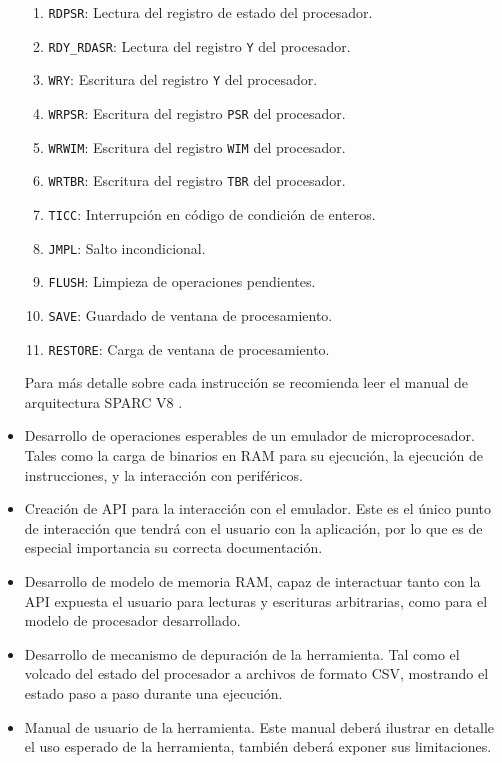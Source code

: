 \begin{itemize}
\begin{enumerate}
    \item \texttt{RDPSR}: Lectura del registro de estado del procesador.

    \item \texttt{RDY\_RDASR}: Lectura del registro \texttt{Y} del procesador.

    \item \texttt{WRY}: Escritura del registro \texttt{Y} del procesador.
    \item \texttt{WRPSR}: Escritura del registro \texttt{PSR} del procesador.
    \item \texttt{WRWIM}: Escritura del registro \texttt{WIM} del procesador.
    \item \texttt{WRTBR}: Escritura del registro \texttt{TBR} del procesador.

    \item \texttt{TICC}: Interrupción en código de condición de enteros.

    \item \texttt{JMPL}: Salto incondicional.
    \item \texttt{FLUSH}: Limpieza de operaciones pendientes.
    \item \texttt{SAVE}: Guardado de ventana de procesamiento.
    \item \texttt{RESTORE}: Carga de ventana de procesamiento.

  \end{enumerate}

  Para más detalle sobre cada instrucción se recomienda leer el manual de arquitectura SPARC V8 \citep{SPARC}.

  \item Desarrollo de operaciones esperables de un emulador de microprocesador. Tales como la carga de binarios en RAM para su ejecución, la ejecución de instrucciones, y la interacción con periféricos.
  \item Creación de API para la interacción con el emulador. Este es el único punto de interacción que tendrá con el usuario con la aplicación, por lo que es de especial importancia su correcta documentación.
  \item Desarrollo de modelo de memoria RAM, capaz de interactuar tanto con la API expuesta el usuario para lecturas y escrituras arbitrarias, como para el modelo de procesador desarrollado.
  \item Desarrollo de mecanismo de depuración de la herramienta. Tal como el volcado del estado del procesador a archivos de formato CSV, mostrando el estado paso a paso durante una ejecución.
  \item Manual de usuario de la herramienta. Este manual deberá ilustrar en detalle el uso esperado de la herramienta, también deberá exponer sus limitaciones.
\end{itemize}
